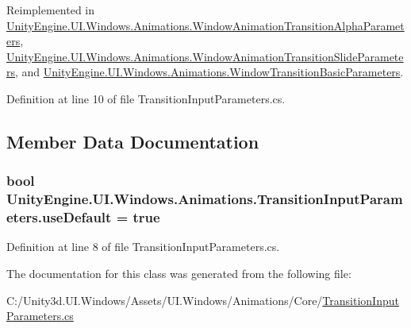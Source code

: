 Reimplemented in \hyperlink{class_unity_engine_1_1_u_i_1_1_windows_1_1_animations_1_1_window_animation_transition_alpha_parameters_afc04940daae80e32a4cdb4a62800caa9}{Unity\+Engine.\+U\+I.\+Windows.\+Animations.\+Window\+Animation\+Transition\+Alpha\+Parameters}, \hyperlink{class_unity_engine_1_1_u_i_1_1_windows_1_1_animations_1_1_window_animation_transition_slide_parameters_a2640533ffadc0abc624577d621331dee}{Unity\+Engine.\+U\+I.\+Windows.\+Animations.\+Window\+Animation\+Transition\+Slide\+Parameters}, and \hyperlink{class_unity_engine_1_1_u_i_1_1_windows_1_1_animations_1_1_window_transition_basic_parameters_a62552986f2ad19d5538ff935cb600c79}{Unity\+Engine.\+U\+I.\+Windows.\+Animations.\+Window\+Transition\+Basic\+Parameters}.



Definition at line 10 of file Transition\+Input\+Parameters.\+cs.



\subsection{Member Data Documentation}
\hypertarget{class_unity_engine_1_1_u_i_1_1_windows_1_1_animations_1_1_transition_input_parameters_a9ac21149c88a6bf003217612ac6b4c24}{}
\subsubsection[{use\+Default}]{\setlength{\rightskip}{0pt plus 5cm}bool Unity\+Engine.\+U\+I.\+Windows.\+Animations.\+Transition\+Input\+Parameters.\+use\+Default = true}\label{class_unity_engine_1_1_u_i_1_1_windows_1_1_animations_1_1_transition_input_parameters_a9ac21149c88a6bf003217612ac6b4c24}


Definition at line 8 of file Transition\+Input\+Parameters.\+cs.



The documentation for this class was generated from the following file\+:\begin{DoxyCompactItemize}
\item 
C\+:/\+Unity3d.\+U\+I.\+Windows/\+Assets/\+U\+I.\+Windows/\+Animations/\+Core/\hyperlink{_transition_input_parameters_8cs}{Transition\+Input\+Parameters.\+cs}\end{DoxyCompactItemize}

